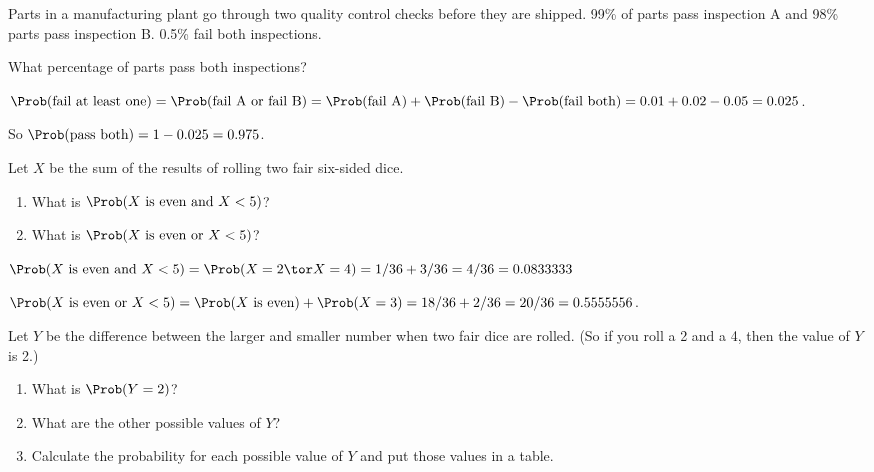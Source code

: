 \documentclass[twoside]{book}\usepackage[]{graphicx}\usepackage[]{xcolor}
\begin{document}
\begin{problem}
Parts in a manufacturing plant go through two quality control checks before they
are shipped.  99\% of parts pass inspection A and 98\% parts pass inspection B.
0.5\% fail both inspections.  

What percentage of parts pass both inspections?
\end{problem}

\begin{solution}
	$\Prob(\mbox{fail at least one}) = \Prob(\mbox{fail A or fail B}) =
	\Prob(\mbox{fail A}) + \Prob(\mbox{fail B}) - \Prob(\mbox{fail both})
	= 0.01 + 0.02 - 0.05 = 0.025$.

	So $\Prob(\mbox{pass both}) = 1 - 0.025 = 0.975$.
\end{solution}

\begin{problem} 
	Let $X$ be the sum of the results of rolling two fair six-sided dice.
	\begin{enumerate}
		\item
			What is $\Prob(\mbox{$X$ is even and $X < 5$})$?
		\item
			What is $\Prob(\mbox{$X$ is even or $X < 5$})$? 
	\end{enumerate}
\end{problem}

\begin{solution}
	$\Prob(\mbox{$X$ is even and $X < 5$}) 
	= \Prob(X = 2 \tor X=4) = 1/36 + 3/36 = 4/36 = 0.0833333$

$\Prob(\mbox{$X$ is even or $X < 5$}) = \Prob(\mbox{$X$ is even}) + \Prob(X=3)
= 18/36 + 2/36 = 20/36 = 0.5555556$.
\end{solution}

\begin{problem}
Let $Y$ be the difference between the larger and smaller number when two fair dice 
are rolled.  (So if you roll a 2 and a 4, then the value of $Y$ is 2.)  
\begin{enumerate}
	\item 
		What is $\Prob(Y=2)$?
	\item
		What are the other possible values of $Y$?
	\item 
		Calculate the probability for each possible value of $Y$
		and put those values in a table.
\end{enumerate}
\end{problem}
\end{document}
